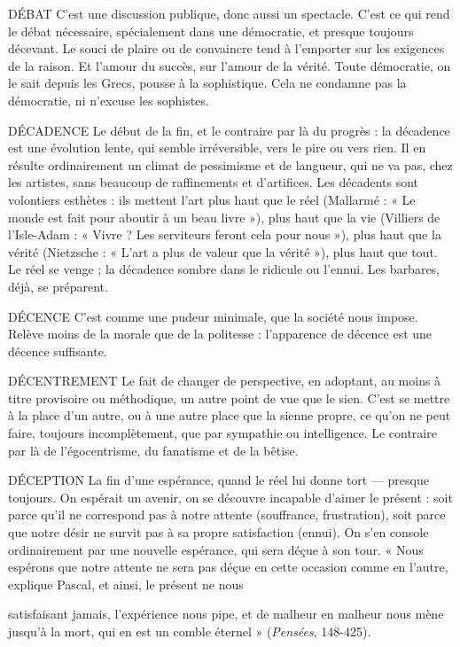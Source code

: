 DÉBAT C'est une discussion publique, donc aussi un spectacle. C’est ce qui
rend le débat nécessaire, spécialement dans une démocratie, et
presque toujours décevant. Le souci de plaire ou de convaincre tend à
l'emporter sur les exigences de la raison. Et l’amour du succès, sur l’amour de
la vérité. Toute démocratie, on le sait depuis les Grecs, pousse à la sophistique.
Cela ne condamne pas la démocratie, ni n’excuse les sophistes.

DÉCADENCE Le début de la fin, et le contraire par là du progrès : la décadence
est une évolution lente, qui semble irréversible, vers
le pire ou vers rien. Il en résulte ordinairement un climat de pessimisme et de
langueur, qui ne va pas, chez les artistes, sans beaucoup de raffinements et
d’artifices. Les décadents sont volontiers esthètes : ils mettent l’art plus haut
que le réel (Mallarmé : « Le monde est fait pour aboutir à un beau livre »), plus
haut que la vie (Villiers de l’Isle-Adam : « Vivre ? Les serviteurs feront cela pour
nous »), plus haut que la vérité (Nietzsche : « L'art a plus de valeur que la
vérité »), plus haut que tout. Le réel se venge ; la décadence sombre dans le ridicule
ou l’ennui. Les barbares, déjà, se préparent.

DÉCENCE C’est comme une pudeur minimale, que la société nous impose.
Relève moins de la morale que de la politesse : l'apparence de
décence est une décence suffisante.

DÉCENTREMENT Le fait de changer de perspective, en adoptant, au moins
à titre provisoire ou méthodique, un autre point de vue
que le sien. C’est se mettre à la place d’un autre, ou à une autre place que la
sienne propre, ce qu’on ne peut faire, toujours incomplètement, que par sympathie
ou intelligence. Le contraire par là de l’égocentrisme, du fanatisme et de
la bêtise.

DÉCEPTION La fin d’une espérance, quand le réel lui donne tort — presque
toujours. On espérait un avenir, on se découvre incapable
d’aimer le présent : soit parce qu’il ne correspond pas à notre attente (souffrance,
frustration), soit parce que notre désir ne survit pas à sa propre satisfaction
(ennui). On s’en console ordinairement par une nouvelle espérance, qui
sera déçue à son tour. « Nous espérons que notre attente ne sera pas déçue en
cette occasion comme en l’autre, explique Pascal, et ainsi, le présent ne nous

satisfaisant jamais, l'expérience nous pipe, et de malheur en malheur nous
mène jusqu’à la mort, qui en est un comble éternel » ({\it Pensées}, 148-425).

